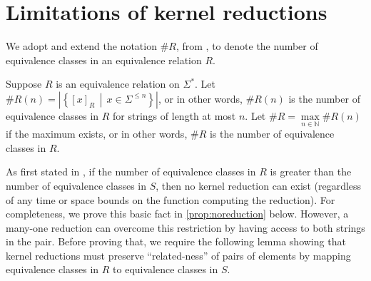 \section{Limitations of kernel reductions}\label{sec:limitations}


We adopt and extend the notation $\#R$, from \autocite{bcffm}, to denote the number of equivalence classes in an equivalence relation $R$.

\begin{definition}%
  Suppose $R$ is an equivalence relation on $\Sigma^*$.
  Let $\#R(n) = \left|\left\{[x]_R \, \middle| \, x \in \Sigma^{\leq n}\right\}\right|$, or in other words, $\#R(n)$ is the number of equivalence classes in $R$ for strings of length at most $n$.
  Let $\#R = \max\limits_{n \in \mathbb{N}} \#R(n)$ if the maximum exists, or in other words, $\#R$ is the number of equivalence classes in $R$.
\end{definition}

As first stated in \autocite{fg11}, if the number of equivalence classes in $R$ is greater than the number of equivalence classes in $S$, then no kernel reduction can exist (regardless of any time or space bounds on the function computing the reduction).
For completeness, we prove this basic fact in \autoref{prop:noreduction} below.
However, a many-one reduction can overcome this restriction by having access to both strings in the pair.
Before proving that, we require the following lemma showing that kernel reductions must preserve ``related-ness'' of pairs of elements by mapping equivalence classes in $R$ to equivalence classes in $S$.

